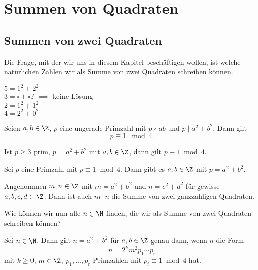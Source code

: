 \chapter{Summen von Quadraten}

\section{Summen von zwei Quadraten}

Die Frage, mit der wir uns in diesem Kapitel beschäftigen wollen, ist welche natürlichen Zahlen wir als Summe von zwei Quadraten schreiben können.

\begin{exmp*}
	\( 5 = 1^2+2^2 \)\\
	\( 3 = \square + \square \)? $\implies$ keine Lösung\\
	\( 2 = 1^2 +1^2 \)\\
	\( 4 = 2^2 + 0^2 \)
\end{exmp*}

\begin{lem}\autolabel
	Seien $a,b \in \Z$, $p$ eine ungerade Primzahl mit $p \nmid ab$ und $p \mid a^2 + b^2$. Dann gilt
	\[ p \equiv 1 \mod 4. \]
\end{lem}

\begin{cor*}
	Ist $p \geq 3$ prim, $p = a^2+b^2$ mit $a,b \in \Z$, dann gilt $p \equiv 1 \bmod 4$.
\end{cor*}

\begin{thm}[Fermat]\autolabel
	Sei $p$ eine Primzahl mit $p \equiv 1 \bmod 4$. Dann gibt es $a,b \in \Z$ mit $p = a^2+b^2$.
\end{thm}

\begin{lem}\autolabel
	Angenommen $m,n \in \Z$ mit $m = a^2+b^2$ und $n = c^2 + d^2$ für gewisse $a,b,c,d \in \Z$. Dann ist auch $m \cdot n$ die Summe von zwei ganzzahligen Quadraten.
\end{lem}

Wie können wir nun alle $n \in \N$ finden, die wir als Summe von zwei Quadraten schreiben können?

\begin{cor}\autolabel
	Sei $n \in \N$. Dann gilt $n = a^2+b^2$ für $a,b \in \Z$ genau dann, wenn $n$ die Form
	\[ n = 2^k m^2 p_1 \dotsm p_r \]
	mit $k \geq 0$, $m \in \Z$, $p_1, \dotsc,p_r$ Primzahlen mit $p_i \equiv 1 \bmod 4$ hat.
\end{cor}

